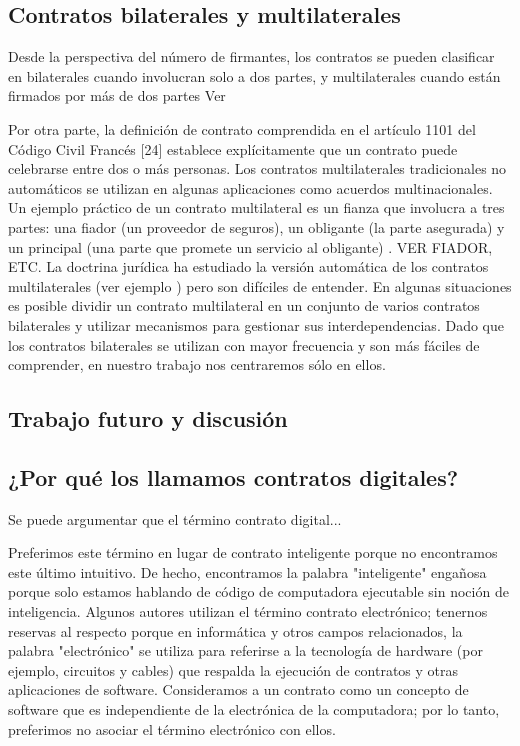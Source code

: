 \documentclass[12pt]{report} %
\begin{document}
\begin{itemize}
\subsection{Contratos bilaterales y multilaterales}

Desde la perspectiva del número de firmantes, los contratos se pueden clasificar en bilaterales cuando involucran solo a dos partes, y multilaterales cuando están firmados por más de dos partes Ver

Por otra parte, la definición de contrato comprendida en el artículo 1101 del Código Civil Francés [24] establece explícitamente que un contrato puede celebrarse entre dos o más personas. Los contratos multilaterales tradicionales no automáticos se utilizan en algunas aplicaciones como acuerdos multinacionales. Un ejemplo práctico de un contrato multilateral es un fianza que involucra a tres partes: una fiador (un proveedor de seguros), un obligante (la parte asegurada) y un principal (una parte que promete un servicio al obligante) . VER FIADOR, ETC. La doctrina jurídica ha  estudiado la versión automática de los contratos multilaterales (ver ejemplo ) pero son difíciles de entender. En algunas situaciones es posible dividir un contrato multilateral en un conjunto de varios contratos bilaterales y utilizar mecanismos para gestionar sus interdependencias. Dado que los contratos bilaterales se utilizan con mayor frecuencia y son más fáciles de comprender, en nuestro trabajo nos centraremos sólo en ellos.

\subsection{Trabajo futuro y discusión}

\subsection{¿Por qué los llamamos contratos digitales?}

Se puede argumentar que el término contrato digital...

Preferimos este término en lugar de contrato inteligente porque no encontramos este último intuitivo. De hecho, encontramos la palabra "inteligente" engañosa porque solo estamos hablando de código de computadora ejecutable sin noción de inteligencia. Algunos autores utilizan el término contrato electrónico; tenernos reservas al respecto porque en informática y otros campos relacionados, la palabra "electrónico" se utiliza para referirse a la tecnología de hardware (por ejemplo, circuitos y cables) que respalda la ejecución de contratos y otras aplicaciones de software. Consideramos a un contrato como un concepto de software que es independiente de la electrónica de la computadora; por lo tanto, preferimos no asociar el término electrónico con ellos.


\end{itemize}
\end{document}
